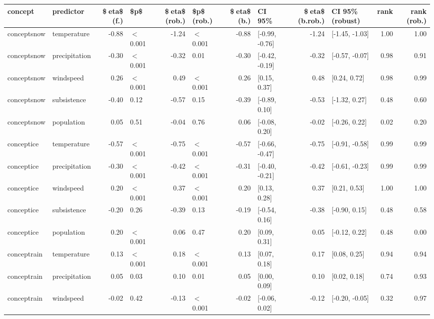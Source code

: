 \begin{table}[ht]
\centering
\begin{tabular}{llrlrlrlrlrr}
  \hline
concept & predictor & \$eta\$ (f.) & \$p\$ & \$eta\$ (rob.) & \$p\$ (rob.) & \$eta\$ (b.) & CI 95\% & \$eta\$ (b.rob.) & CI 95\% (robust) & rank & rank (rob.) \\ 
  \hline
conceptsnow & temperature & -0.88 & $<$ 0.001 & -1.24 & $<$ 0.001 & -0.88 & [-0.99, -0.76] & -1.24 & [-1.45, -1.03] & 1.00 & 1.00 \\ 
  conceptsnow & precipitation & -0.30 & $<$ 0.001 & -0.32 & 0.01 & -0.30 & [-0.42, -0.19] & -0.32 & [-0.57, -0.07] & 0.98 & 0.91 \\ 
  conceptsnow & windspeed & 0.26 & $<$ 0.001 & 0.49 & $<$ 0.001 & 0.26 & [0.15, 0.37] & 0.48 & [0.24, 0.72] & 0.98 & 0.99 \\ 
  conceptsnow & subsistence & -0.40 & 0.12 & -0.57 & 0.15 & -0.39 & [-0.89, 0.10] & -0.53 & [-1.32, 0.27] & 0.48 & 0.60 \\ 
  conceptsnow & population & 0.05 & 0.51 & -0.04 & 0.76 & 0.06 & [-0.08, 0.20] & -0.02 & [-0.26, 0.22] & 0.02 & 0.20 \\ 
  conceptice & temperature & -0.57 & $<$ 0.001 & -0.75 & $<$ 0.001 & -0.57 & [-0.66, -0.47] & -0.75 & [-0.91, -0.58] & 0.99 & 0.99 \\ 
  conceptice & precipitation & -0.30 & $<$ 0.001 & -0.42 & $<$ 0.001 & -0.31 & [-0.40, -0.21] & -0.42 & [-0.61, -0.23] & 0.99 & 0.99 \\ 
  conceptice & windspeed & 0.20 & $<$ 0.001 & 0.37 & $<$ 0.001 & 0.20 & [0.13, 0.28] & 0.37 & [0.21, 0.53] & 1.00 & 1.00 \\ 
  conceptice & subsistence & -0.20 & 0.26 & -0.39 & 0.13 & -0.19 & [-0.54, 0.16] & -0.38 & [-0.90, 0.15] & 0.48 & 0.58 \\ 
  conceptice & population & 0.20 & $<$ 0.001 & 0.06 & 0.47 & 0.20 & [0.09, 0.31] & 0.05 & [-0.12, 0.22] & 0.48 & 0.00 \\ 
  conceptrain & temperature & 0.13 & $<$ 0.001 & 0.18 & $<$ 0.001 & 0.13 & [0.07, 0.18] & 0.17 & [0.08, 0.25] & 0.94 & 0.94 \\ 
  conceptrain & precipitation & 0.05 & 0.03 & 0.10 & 0.01 & 0.05 & [0.00, 0.09] & 0.10 & [0.02, 0.18] & 0.74 & 0.93 \\ 
  conceptrain & windspeed & -0.02 & 0.42 & -0.13 & $<$ 0.001 & -0.02 & [-0.06, 0.02] & -0.12 & [-0.20, -0.05] & 0.32 & 0.97 \\ 

\end{tabular}
\end{table}
